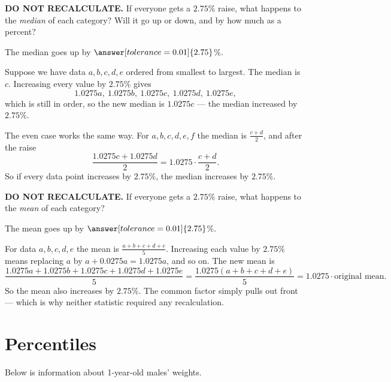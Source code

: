 \documentclass[12pt]{ximera}
\begin{document}
\begin{problem}
\textbf{DO NOT RECALCULATE.} If everyone gets a $2.75\%$ raise, what happens to the
\emph{median} of each category? Will it go up or down, and by how much as a percent?

The median goes up by $\answer[tolerance=0.01]{2.75}$\%.

\begin{solution}
Suppose we have data $a, b, c, d, e$ ordered from smallest to largest. The median is
$c$. Increasing every value by $2.75\%$ gives
\[
1.0275a,\ 1.0275b,\ 1.0275c,\ 1.0275d,\ 1.0275e,
\]
which is still in order, so the new median is $1.0275c$ --- the median increased by
$2.75\%$.

The even case works the same way. For $a, b, c, d, e, f$ the median is
$\frac{c+d}{2}$, and after the raise
\[
\frac{1.0275c + 1.0275d}{2} = 1.0275 \cdot \frac{c+d}{2}.
\]
So if every data point increases by $2.75\%$, the median increases by $2.75\%$.
\end{solution}
\end{problem}

\begin{problem}
\textbf{DO NOT RECALCULATE.} If everyone gets a $2.75\%$ raise, what happens to the
\emph{mean} of each category?

The mean goes up by $\answer[tolerance=0.01]{2.75}$\%.

\begin{solution}
For data $a, b, c, d, e$ the mean is $\frac{a+b+c+d+e}{5}$. Increasing each value by
$2.75\%$ means replacing $a$ by $a + 0.0275a = 1.0275a$, and so on. The new mean is
\[
\frac{1.0275a + 1.0275b + 1.0275c + 1.0275d + 1.0275e}{5}
= \frac{1.0275(a+b+c+d+e)}{5}
= 1.0275 \cdot \text{original mean}.
\]
So the mean also increases by $2.75\%$. The common factor simply pulls out front ---
which is why neither statistic required any recalculation.
\end{solution}
\end{problem}

\section*{Percentiles}

Below is information about 1-year-old males' weights.

\end{document}
